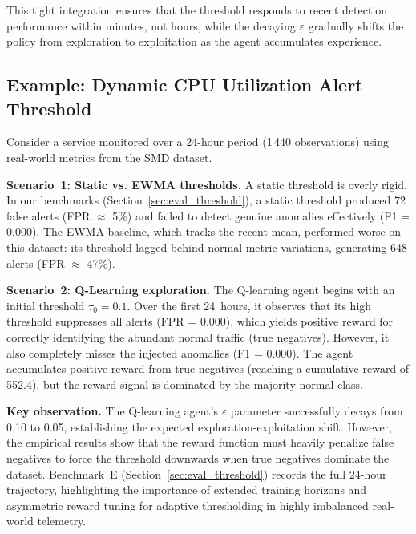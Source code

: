 This tight integration ensures that the threshold responds to recent detection
performance within minutes, not hours, while the decaying $\varepsilon$
gradually shifts the policy from exploration to exploitation as the agent
accumulates experience.

\subsection{Example: Dynamic CPU Utilization Alert Threshold}
\label{subsec:threshold_example}

Consider a service monitored over a 24-hour period (1\,440 observations)
using real-world metrics from the SMD dataset.

\textbf{Scenario~1: Static vs. EWMA thresholds.}
A static threshold is overly rigid. In our benchmarks
(Section~\ref{sec:eval_threshold}), a static threshold produced 72 false alerts
(FPR $\approx$ 5\%) and failed to detect genuine anomalies effectively
(F1 = 0.000). The EWMA baseline, which tracks the recent mean, performed worse
on this dataset: its threshold lagged behind normal metric variations,
generating 648 alerts (FPR $\approx$ 47\%).

\textbf{Scenario~2: Q-Learning exploration.}
The Q-learning agent begins with an initial threshold $\tau_0 = 0.1$. Over the
first 24~hours, it observes that its high threshold suppresses all alerts
(FPR = 0.000), which yields positive reward for correctly identifying the
abundant normal traffic (true negatives). However, it also completely misses
the injected anomalies (F1 = 0.000). The agent accumulates positive reward
from true negatives (reaching a cumulative reward of 552.4), but the reward
signal is dominated by the majority normal class.

\textbf{Key observation.} The Q-learning agent's $\varepsilon$ parameter successfully
decays from 0.10 to 0.05, establishing the expected exploration-exploitation
shift. However, the empirical results show that the reward function must heavily
penalize false negatives to force the threshold downwards when true negatives
dominate the dataset. Benchmark~E (Section~\ref{sec:eval_threshold}) records
the full 24-hour trajectory, highlighting the importance of extended
training horizons and asymmetric reward tuning for adaptive thresholding
in highly imbalanced real-world telemetry.
